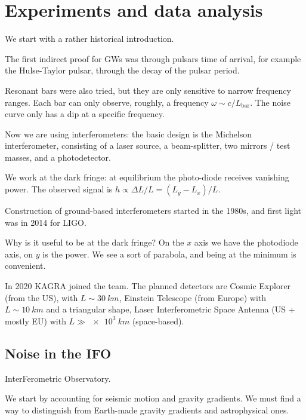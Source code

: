 \documentclass[main.tex]{subfiles}
\begin{document}
\section{Experiments and data analysis}


We start with a rather historical introduction. 

The first indirect proof for GWs was through pulsars time of arrival, for example the Hulse-Taylor pulsar, through the decay of the pulsar period. 

Resonant bars were also tried, but they are only sensitive to narrow frequency ranges. Each bar can only observe, roughly, a frequency \(\omega \sim c / L _{\text{bar}}\). 
The noise curve only has a dip at a specific frequency. 

Now we are using interferometers: the basic design is the Michelson interferometer, consisting of a laser source, a beam-splitter, two mirrors / test masses, and a photodetector. 

We work at the dark fringe: at equilibrium the photo-diode receives vanishing power. 
The observed signal is \(h \propto \Delta L / L = (L_y - L_x) / L\). 

Construction of ground-based interferometers started in the 1980s, and first light was in 2014 for LIGO. 

Why is it useful to be at the dark fringe? 
On the \(x\) axis we have the photodiode axis, on \(y\) is the power. We see a sort of parabola, and being at the minimum is convenient. 

In 2020 KAGRA joined the team. 
The planned detectors are Cosmic Explorer (from the US), with \(L \sim \SI{30}{km}\), Einstein Telescope (from Europe) with \(L \sim \SI{10}{km}\) and a triangular shape, Laser Interferometric Space Antenna (US + mostly EU) with  \(L \gg \SI{e3}{km}\) (space-based). 

\subsection{Noise in the IFO}

InterFerometric Observatory. 

We start by accounting for seismic motion and gravity gradients. 
We must find a way to distinguish from Earth-made gravity gradients and astrophysical ones. 
\end{document}

